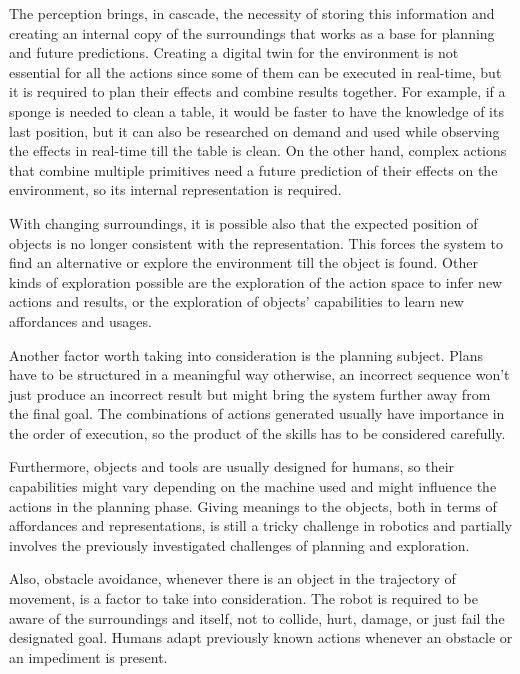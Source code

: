The perception brings, in cascade, the necessity of storing this information and creating an internal copy of the surroundings that works as a base for planning and future predictions. Creating a digital twin for the environment is not essential for all the actions since some of them can be executed in real-time, but it is required to plan their effects and combine results together. For example, if a sponge is needed to clean a table, it would be faster to have the knowledge of its last position, but it can also be researched on demand and used while observing the effects in real-time till the table is clean. On the other hand, complex actions that combine multiple primitives need a future prediction of their effects on the environment, so its internal representation is required. 

With changing surroundings, it is possible also that the expected position of objects is no longer consistent with the representation. This forces the system to find an alternative or explore the environment till the object is found. Other kinds of exploration possible are the exploration of the action space to infer new actions and results, or the exploration of objects' capabilities to learn new affordances and usages. \cite{Ahmetoglu_2022} 

Another factor worth taking into consideration is the planning subject. Plans have to be structured in a meaningful way otherwise, an incorrect sequence won't just produce an incorrect result but might bring the system further away from the final goal. The combinations of actions generated usually have importance in the order of execution, so the product of the skills has to be considered carefully. 

Furthermore, objects and tools are usually designed for humans, so their capabilities might vary depending on the machine used and might influence the actions in the planning phase. Giving meanings to the objects, both in terms of affordances and representations, is still a tricky challenge in robotics and partially involves the previously investigated challenges of planning and exploration. 

Also, obstacle avoidance, whenever there is an object in the trajectory of movement, is a factor to take into consideration. The robot is required to be aware of the surroundings and itself, not to collide, hurt, damage, or just fail the designated goal. Humans adapt previously known actions whenever an obstacle or an impediment is present. 

